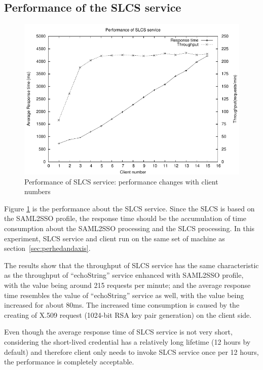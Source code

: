 \documentclass[conference]{IEEEtran}
\begin{document}
\subsection{Performance of the SLCS service}
\label{sec:perfslcsserv}

\begin{figure}
\includegraphics[width=0.9\columnwidth]{SLCS_thread_all.pdf}
\caption{Performance of SLCS service: performance changes with client numbers}
\label{fig:SLCS_thread_all}
\end{figure}

Figure \ref{fig:SLCS_thread_all} is the performance about the SLCS service.
Since the SLCS is based on the SAML2SSO profile, the response time should be the accumulation of
time consumption about the SAML2SSO processing and the SLCS processing. In this experiment, SLCS
service and client run on the same set of machine as section~\ref{sec:perhedandaxis}. 

The results show that the throughput of SLCS service has the same characteristic
as the throughput of ``echoString'' service enhanced with SAML2SSO profile, with the value being
around 215 requests per minute; and the average response time resembles the value of
``echoString'' service as well, with the value being increased for about 80ms. The increased time
consumption is caused by the creating of X.509 request (1024-bit RSA key pair generation) on the client
side.

Even though the average response time of SLCS service is not very short,
considering the short-lived credential has a relatively long lifetime (12 hours by default) and therefore
client only needs to invoke SLCS service once per 12 hours, the performance is completely acceptable.
\end{document}
